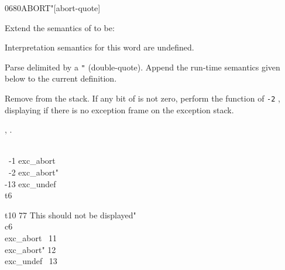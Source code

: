 \begin{worddef}[ABORTq]{0680}{ABORT"}[abort-quote]
\item Extend the semantics of  to be:

\interpret
	Interpretation semantics for this word are undefined.

\compile

	Parse  delimited by a \texttt{"} (double-quote).
	Append the run-time semantics given below to the current
	definition.

\runtime

	Remove  from the stack. If any bit of 
	is not zero, perform the function of \texttt{-2} ,
	displaying  if there is no exception frame on the
	exception stack.

\see {},
	.

	\begin{testing}\ttfamily
		 \\
		\mbox{}~-1	 exc\_abort \\
		\mbox{}~-2  exc\_abort" \\
		-13  exc\_undef \\
		\word{:} t6  \word{;}


		\word{:} t10 77   This should not be displayed" \word{;} \\
		\word{:} c6  \\
		\tab {} exc\_abort~  11  \\
		\tab[3.5]		 exc\_abort"  12  \\
		\tab[3.5]		 exc\_undef~  13  \\
		\tab {} \\
		\word{;}

		 \tab {}  \\
		 \tab {}  \\
		 \tab {} 
	\end{testing}
\end{worddef}
